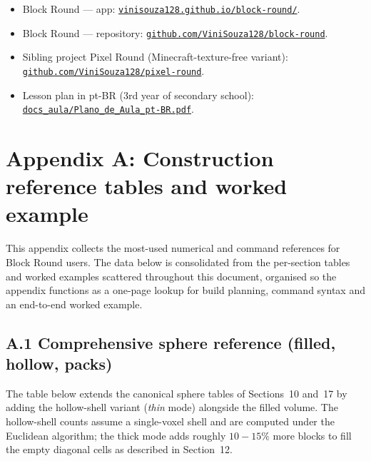 \documentclass[12pt,a4paper]{scrartcl}
\newcommand{\biblink}[2]{\href{#1}{\nolinkurl{#2}}}
\begin{document}
\begin{itemize}[leftmargin=1.4em,itemsep=0.3em,topsep=0.3em]
  \item Block Round --- app: \biblink{https://vinisouza128.github.io/block-round/}{vinisouza128.github.io/block-round/}.
  \item Block Round --- repository: \biblink{https://github.com/ViniSouza128/block-round}{github.com/ViniSouza128/block-round}.
  \item Sibling project Pixel Round (Minecraft-texture-free variant):
        \biblink{https://github.com/ViniSouza128/pixel-round}{github.com/ViniSouza128/pixel-round}.
  \item Lesson plan in pt-BR (3rd year of secondary school):
        \biblink{https://vinisouza128.github.io/block-round/docs_aula/Plano_de_Aula_pt-BR.pdf}{docs\_aula/Plano\_de\_Aula\_pt-BR.pdf}.
\end{itemize}


\clearpage

\section*{\color{accent}Appendix A: Construction reference tables and worked example}

This appendix collects the most-used numerical and command references for Block Round users. The data below is consolidated from the per-section tables and worked examples scattered throughout this document, organised so the appendix functions as a one-page lookup for build planning, command syntax and an end-to-end worked example.

\subsection*{A.1 Comprehensive sphere reference (filled, hollow, packs)}
The table below extends the canonical sphere tables of Sections~10 and~17 by adding the hollow-shell variant (\emph{thin} mode) alongside the filled volume. The hollow-shell counts assume a single-voxel shell and are computed under the Euclidean algorithm; the thick mode adds roughly $10{-}15\%$ more blocks to fill the empty diagonal cells as described in Section~12.
\end{document}
